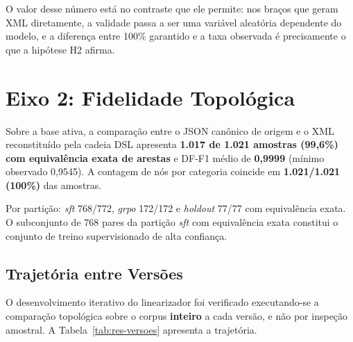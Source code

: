 O valor desse número está no contraste que ele permite: nos braços que geram XML diretamente, a validade passa a ser uma variável aleatória dependente do modelo, e a diferença entre 100\% garantido e a taxa observada é precisamente o que a hipótese H2 afirma.

\section{Eixo 2: Fidelidade Topológica}
\label{sec:res-eixo2}

Sobre a base ativa, a comparação entre o JSON canônico de origem e o XML reconstituído pela cadeia DSL apresenta \textbf{1.017 de 1.021 amostras (99,6\%) com equivalência exata de arestas} e DF-F1 médio de \textbf{0,9999} (mínimo observado 0,9545). A contagem de nós por categoria coincide em \textbf{1.021/1.021 (100\%)} das amostras.

Por partição: \textit{sft} 768/772, \textit{grpo} 172/172 e \textit{holdout} 77/77 com equivalência exata. O subconjunto de 768 pares da partição \textit{sft} com equivalência exata constitui o conjunto de treino supervisionado de alta confiança.

\subsection{Trajetória entre Versões}
\label{subsec:res-trajetoria}

O desenvolvimento iterativo do linearizador foi verificado executando-se a comparação topológica sobre o corpus \textbf{inteiro} a cada versão, e não por inspeção amostral. A Tabela~\ref{tab:res-versoes} apresenta a trajetória.

\begin{table}[h!]
\end{table}

